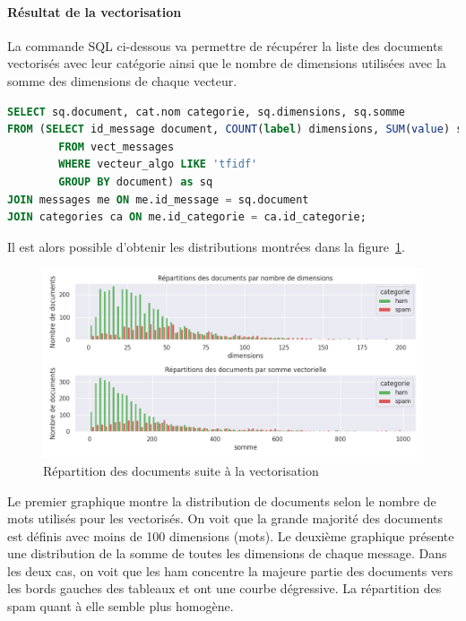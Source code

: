         \paragraph{Résultat de la vectorisation}
        La commande SQL ci-dessous va permettre de récupérer la liste des documents vectorisés avec leur catégorie ainsi que le nombre de dimensions utilisées avec la somme des dimensions de chaque vecteur.
        \begin{lstlisting}[title=Commande SQL pour lister les documents vectoriser, language=SQL]
SELECT sq.document, cat.nom categorie, sq.dimensions, sq.somme
FROM (SELECT id_message document, COUNT(label) dimensions, SUM(value) somme
        FROM vect_messages
        WHERE vecteur_algo LIKE 'tfidf'
        GROUP BY document) as sq
JOIN messages me ON me.id_message = sq.document
JOIN categories ca ON me.id_categorie = ca.id_categorie;
        \end{lstlisting}
        Il est alors possible d'obtenir les distributions montrées dans la figure~\ref{fig:tfidf_distr}.
        \begin{figure}[H]
            \includegraphics[width=\linewidth]{img/vectdash}
            \caption{Répartition des documents suite à la vectorisation}
            \label{fig:tfidf_distr}
        \end{figure}
        Le premier graphique montre la distribution de documents selon le nombre de mots utilisés pour les vectorisés.
        On voit que la grande majorité des documents est définis avec moins de 100 dimensions (mots).
        Le deuxième graphique présente une distribution de la somme de toutes les dimensions de chaque message.
        Dans les deux cas, on voit que les ham concentre la majeure partie des documents vers les bords gauches des tableaux et ont une courbe dégressive.
        La répartition des spam quant à elle semble plus homogène.\\

